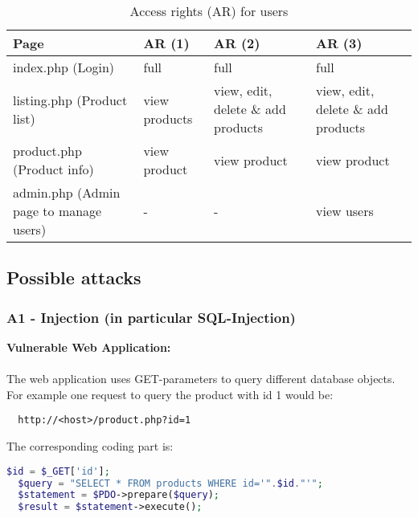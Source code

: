 \clearpage
\begin{table}[htbp]
  \begin{center}
    \begin{tabularx}{\textwidth}{|X|p{3cm}|p{3cm}|p{3cm}|}
      \hline
      \textbf{Page} & \textbf{AR (1)} & \textbf{AR (2)} & \textbf{AR (3)} \\
      \hline
      \hline
      index.php \newline (Login) & full & full & full \\
      \hline
      listing.php \newline (Product list) & view products & view, edit, delete \& add products & view, edit, delete \& add products \\
      \hline
      product.php \newline (Product info) & view product & view product & view product \\
      \hline
      admin.php \newline (Admin page to manage users) & - & - & view users \\
      \hline
    \end{tabularx}
    \caption{Access rights (AR) for users}
    \label{tab:software_components}
  \end{center}
\end{table}


\subsection{Possible attacks}

\subsubsection{A1 - Injection (in particular SQL-Injection)}

\textbf{Vulnerable Web Application:} \\
\\
The web application uses GET-parameters to query different database objects. For example one request to query the product with id 1 would be:

\begin{lstlisting}
  http://<host>/product.php?id=1
\end{lstlisting}

The corresponding coding part is:

\begin{lstlisting}[language=PHP]
  $id = $_GET['id'];
  $query = "SELECT * FROM products WHERE id='".$id."'";
  $statement = $PDO->prepare($query);
  $result = $statement->execute();
\end{lstlisting}


